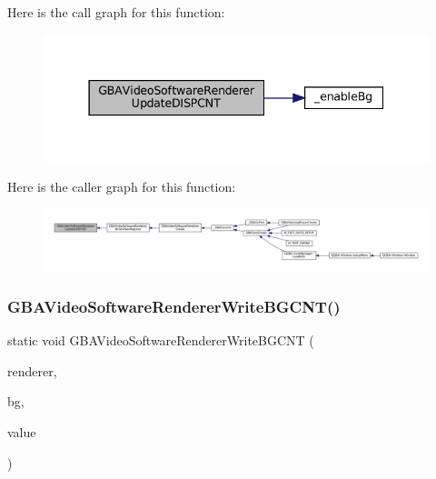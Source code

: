 Here is the call graph for this function\+:
\nopagebreak
\begin{figure}[H]
\begin{center}
\leavevmode
\includegraphics[width=337pt]{video-software_8c_af42a52538b50022349db835033b5a120_cgraph}
\end{center}
\end{figure}
Here is the caller graph for this function\+:
\nopagebreak
\begin{figure}[H]
\begin{center}
\leavevmode
\includegraphics[width=350pt]{video-software_8c_af42a52538b50022349db835033b5a120_icgraph}
\end{center}
\end{figure}
\mbox{\label{video-software_8c_a4adca13f5c1896b8401ab6282c639828}} 
\subsubsection{\texorpdfstring{G\+B\+A\+Video\+Software\+Renderer\+Write\+B\+G\+C\+N\+T()}{GBAVideoSoftwareRendererWriteBGCNT()}}
{\footnotesize\ttfamily static void G\+B\+A\+Video\+Software\+Renderer\+Write\+B\+G\+C\+NT (\begin{DoxyParamCaption}\item[{struct G\+B\+A\+Video\+Software\+Renderer $\ast$}]{renderer,  }\item[{struct G\+B\+A\+Video\+Software\+Background $\ast$}]{bg,  }\item[{uint16\+\_\+t}]{value }\end{DoxyParamCaption})\hspace{0.3cm}{\ttfamily [static]}}

